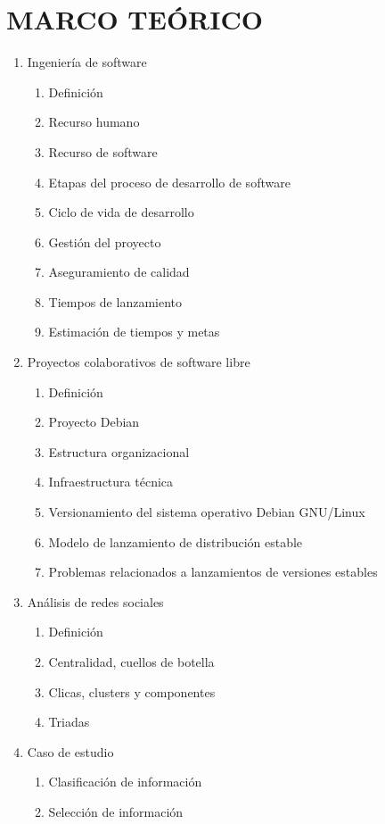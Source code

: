 \documentclass[12pt]{report}
\begin{document}
\chapter*{MARCO TEÓRICO}
\begin{enumerate}
\item Ingeniería de software
  \begin{enumerate}
  \item Definición
  \item Recurso humano
  \item Recurso de software
  \item Etapas del proceso de desarrollo de software
  \item Ciclo de vida de desarrollo
  \item Gestión del proyecto
  \item Aseguramiento de calidad    
  \item Tiempos de lanzamiento
  \item Estimación de tiempos y metas
  \end{enumerate}
\item Proyectos colaborativos de software libre
  \begin{enumerate}
  \item Definición
  \item Proyecto Debian
  \item Estructura organizacional
  \item Infraestructura técnica
  \item Versionamiento del sistema operativo Debian GNU/Linux
  \item Modelo de lanzamiento de distribución estable
  \item Problemas relacionados a lanzamientos de versiones estables
  \end{enumerate}
\item Análisis de redes sociales
  \begin{enumerate}
  \item Definición
  \item Centralidad, cuellos de botella
  \item Clicas, clusters y componentes
  \item Triadas
  \end{enumerate}
\item Caso de estudio
  \begin{enumerate}
  \item Clasificación de información
  \item Selección de información

\end{enumerate}
\end{enumerate}
\end{document}
